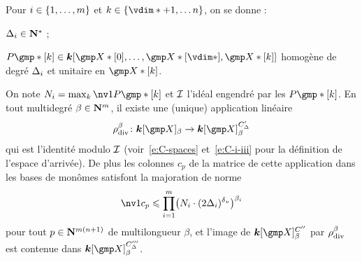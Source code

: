\begin{lem}
  Pour \( i \in \{ 1, \dots, m \} \) et \( \ind \in \{ \vdim* + 1,
  \dots n \} \), on se donne :
  \begin{enumthm}
    \item \( \Delta_i \in {\mathbf{N}}^* \) ;
    \item \( P\mexp*[\ind]
      \in
      \cdn [ \vmp*[0], \dots, \vmp*[\vdim*], \vmp*[\ind] ] \)
      homogène de degré \( \Delta_i \) et unitaire en \( \vmp*[\ind]
      \).
  \end{enumthm}
  On note \( N_\fct = \max_\ind \nv1 { P\mexp*[\ind] } \) et \( \mathcal I \)
  l'idéal engendré par les \( P\mexp*[\ind] \). En tout multidegré
  \( \beta \in {\mathbf{N}}^m \), il existe une (unique) application linéaire
  \begin{equation}
    \rdiv^\beta \colon \cdn [\vmp]_ \beta \to \cdn [\vmp]_ \beta^{C'_\Delta}
  \end{equation}
  qui est l'identité modulo \( \mathcal I \) (voir~\eqref{e:C-spaces}
  et~\eqref{e:C-i-iii} pour la définition de l'espace d'arrivée). De plus les
  colonnes \( c_p \) de la matrice de cette application dans les bases de
  monômes satisfont la majoration de norme
  \begin{equation}
    \nv1{c_p}
    \le
    \prod\fctrange \bigl(
    N_\fct \cdot (2 \Delta_\fct)^\dv
    \bigr) ^{\beta_\fct}
  \end{equation}
  pour tout \( p \in {\mathbf{N}}^{m(n+1)} \) de multilongueur \( \beta \), et
  l'image de \( \cdn [\vmp]_ \beta ^{C''} \) par \( \rho\sb{\mathrm{div }}^\beta \) est
  contenue dans \( \cdn [\vmp]_ \beta ^{C'''_\Delta} \).
\end{lem}

